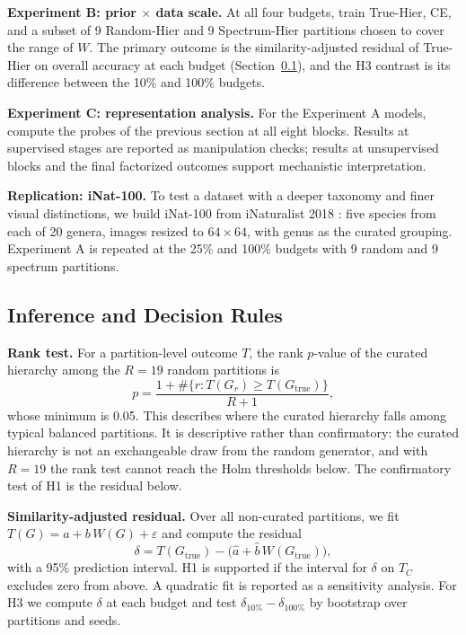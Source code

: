 \documentclass[conference]{IEEEtran}
\begin{document}
\textbf{Experiment B: prior $\times$ data scale.} At all four budgets, train True-Hier, CE, and a subset of 9 Random-Hier and 9 Spectrum-Hier partitions chosen to cover the range of $W$. The primary outcome is the similarity-adjusted residual of True-Hier on overall accuracy at each budget (Section~\ref{sec:inference}), and the H3 contrast is its difference between the 10\% and 100\% budgets.

\textbf{Experiment C: representation analysis.} For the Experiment A models, compute the probes of the previous section at all eight blocks. Results at supervised stages are reported as manipulation checks; results at unsupervised blocks and the final factorized outcomes support mechanistic interpretation.

\textbf{Replication: iNat-100.} To test a dataset with a deeper taxonomy and finer visual distinctions, we build iNat-100 from iNaturalist 2018 \cite{vanhorn2018inat}: five species from each of 20 genera, images resized to $64\times64$, with genus as the curated grouping. Experiment A is repeated at the 25\% and 100\% budgets with 9 random and 9 spectrum partitions.

\subsection{Inference and Decision Rules}
\label{sec:inference}
\textbf{Rank test.} For a partition-level outcome $T$, the rank $p$-value of the curated hierarchy among the $R=19$ random partitions is
\begin{equation}
p=\frac{1+\#\{r: T(G_r)\geq T(G_{\mathrm{true}})\}}{R+1},
\label{eq:rank}
\end{equation}
whose minimum is 0.05. This describes where the curated hierarchy falls among typical balanced partitions. It is descriptive rather than confirmatory: the curated hierarchy is not an exchangeable draw from the random generator, and with $R=19$ the rank test cannot reach the Holm thresholds below. The confirmatory test of H1 is the residual below.

\textbf{Similarity-adjusted residual.} Over all non-curated partitions, we fit $T(G)=a+b\,W(G)+\varepsilon$ and compute the residual
\begin{equation}
\delta=T(G_{\mathrm{true}})-\big(\hat a+\hat b\,W(G_{\mathrm{true}})\big),
\label{eq:residual}
\end{equation}
with a 95\% prediction interval. H1 is supported if the interval for $\delta$ on $T_C$ excludes zero from above. A quadratic fit is reported as a sensitivity analysis. For H3 we compute $\delta$ at each budget and test $\delta_{10\%}-\delta_{100\%}$ by bootstrap over partitions and seeds.
\end{document}
